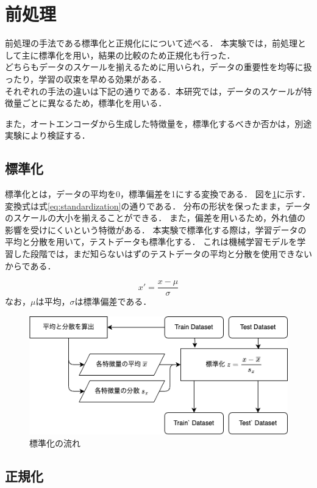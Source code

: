 \section{前処理}\label{sec:preprocess}
前処理の手法である標準化と正規化にについて述べる．
本実験では，前処理として主に標準化を用い，結果の比較のため正規化も行った．\\
どちらもデータのスケールを揃えるために用いられ，データの重要性を均等に扱ったり，学習の収束を早める効果がある．\\
それぞれの手法の違いは下記の通りである．本研究では，データのスケールが特徴量ごとに異なるため，標準化を用いる．

また，オートエンコーダから生成した特徴量を，標準化するべきか否かは，別途実験により検証する．

\subsection{標準化}

標準化とは，データの平均を0，標準偏差を1にする変換である．
図を\ref{fig:standardization}に示す．
変換式は式\ref{eq:standardization}の通りである．
分布の形状を保ったまま，データのスケールの大小を揃えることができる．
また，偏差を用いるため，外れ値の影響を受けにくいという特徴がある．
本実験で標準化する際は，学習データの平均と分散を用いて，テストデータも標準化する．
これは機械学習モデルを学習した段階では，まだ知らないはずのテストデータの平均と分散を使用できないからである．

\begin{equation}
  \label{eq:standardization}
  x' = \frac{x - \mu}{\sigma}
\end{equation}
なお，$\mu$は平均，$\sigma$は標準偏差である．

\begin{figure}[htbp]
  \centering
  \includegraphics[width=0.6\linewidth]{figures/standardization.png}
  \caption{標準化の流れ}
  \label{fig:standardization}
\end{figure}

\subsection{正規化}

